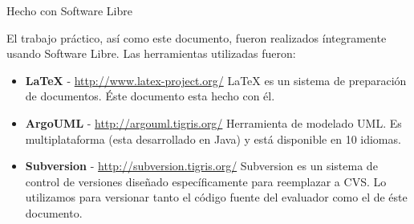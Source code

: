 %
% 
%

\thispagestyle{empty}

\begin{center}
\LARGE{Hecho con Software Libre}
\end{center}

\noindent

El trabajo práctico, así como este documento, fueron realizados íntegramente
usando Software Libre. Las herramientas utilizadas fueron:

\begin{flushleft}
\begin{itemize}

\item \textbf{\LaTeX} - \href{http://www.latex-project.org/}
  {http://www.latex-project.org/}
\linebreak\LaTeX{} es un sistema de preparación de documentos. Éste
  documento esta hecho con él.


\item \textbf{ArgoUML} - \href{http://argouml.tigris.org/}
  {http://argouml.tigris.org/}
\linebreak Herramienta de modelado UML. Es multiplataforma (esta desarrollado
en Java) y está disponible en 10 idiomas.

\item \textbf{Subversion} - \href{http://subversion.tigris.org/}
  {http://subversion.tigris.org/}
\linebreak Subversion es un sistema de control de versiones diseñado
  específicamente para reemplazar a CVS. Lo utilizamos para versionar
  tanto el código fuente del evaluador como el de éste documento.




\end{itemize}
\end{flushleft}
